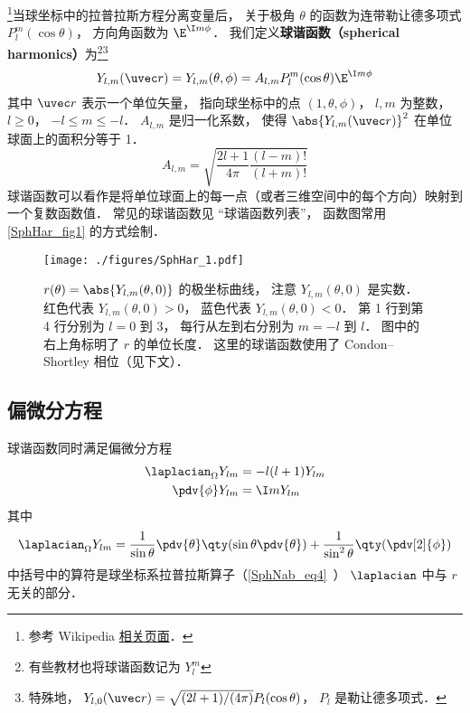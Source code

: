 

\footnote{参考 Wikipedia \href{https://en.wikipedia.org/wiki/Spherical_harmonics}{相关页面}．}当球坐标中的拉普拉斯方程分离变量后， 关于极角 $\theta$ 的函数为连带勒让德多项式 $P_l^m(\cos\theta)$， 方向角函数为 $\E^{\I m\phi}$． 我们定义\textbf{球谐函数（spherical harmonics）}为\footnote{有些教材也将球谐函数记为 $Y_l^m$}\footnote{特殊地， $Y_{l,0}(\uvec r) = \sqrt{(2l + 1)/(4\pi)}P_l(\cos\theta)$， $P_l$ 是勒让德多项式．}
\begin{equation}\label{SphHar_eq1}
Y_{l, m} (\uvec r) = Y_{l, m}(\theta, \phi) = A_{l,m} P_l^m(\cos \theta) \E^{\I m\phi}
\end{equation}
其中 $\uvec r$ 表示一个单位矢量， 指向球坐标中的点 $(1, \theta, \phi)$， $l, m$ 为整数， $l \geqslant 0$， $-l \leqslant m \leqslant -l$． $A_{l,m}$ 是归一化系数， 使得 $\abs{Y_{l, m} (\uvec r)}^2$ 在单位球面上的面积分等于 1．
\begin{equation}\label{SphHar_eq2}
A_{l,m} =  \sqrt{\frac{2l + 1}{4\pi }\frac{(l - m)!}{(l + m)!}}
\end{equation}
球谐函数可以看作是将单位球面上的每一点（或者三维空间中的每个方向）映射到一个复数函数值． 常见的球谐函数见 “球谐函数列表”， 函数图常用\autoref{SphHar_fig1} 的方式绘制．

\begin{figure}[ht]
\centering
\texttt{[image: ./figures/SphHar\_1.pdf]}
\caption{$r(\theta) = \abs{Y_{l,m}(\theta, 0)}$ 的极坐标曲线， 注意 $Y_{l,m}(\theta, 0)$ 是实数． 红色代表 $Y_{l,m}(\theta, 0) > 0$， 蓝色代表 $Y_{l,m}(\theta, 0) < 0$． 第 1 行到第 4 行分别为 $l = 0$ 到 $3$， 每行从左到右分别为 $m = -l$ 到 $l$． 图中的右上角标明了 $r$ 的单位长度． 这里的球谐函数使用了 Condon–Shortley 相位（见下文）．} \label{SphHar_fig1}
\end{figure}

\subsection{偏微分方程}
球谐函数同时满足偏微分方程
\begin{align}
\laplacian_\Omega Y_{lm} &= -l(l+1)Y_{lm}\\
\pdv{\phi} Y_{lm} &= \I m Y_{lm}
\end{align}
其中
\begin{equation}
\laplacian_\Omega Y_{lm} = \frac{1}{\sin\theta}\pdv{\theta} \qty(\sin \theta \pdv{\theta}) + \frac{1}{\sin^2 \theta} \qty(\pdv[2]{\phi})
\end{equation}
中括号中的算符是球坐标系拉普拉斯算子（\autoref{SphNab_eq4}~） $\laplacian$ 中与 $r$ 无关的部分．

